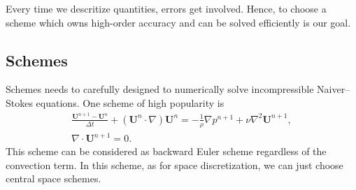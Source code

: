 \documentclass[english, nochinese]{pkupaper}
\begin{document}
Every time we descritize quantities, errors get involved. Hence, to choose a scheme which owns high-order accuracy and can be solved efficiently is our goal.

\subsection{Schemes}\label{SSec:Schemes}



Schemes needs to carefully designed to numerically solve incompressible Naiver--Stokes equations. One scheme of high popularity is
\begin{equation}
\begin{gathered}
\frac{\mathbf{U}^{n+1} - \mathbf{U}^n}{\Delta t} + (\mathbf{U}^n\cdot\nabla)\mathbf{U}^n = - \frac{1}{\rho} \nabla p^{n+1} + \nu \nabla^2 \mathbf{U}^{n+1}, \\
\nabla\cdot \mathbf{U}^{n+1} = 0.
\end{gathered}
\end{equation}
This scheme can be considered as backward Euler scheme regardless of the convection term. In this scheme, as for space discretization, we can just choose central space schemes.


\end{document}

